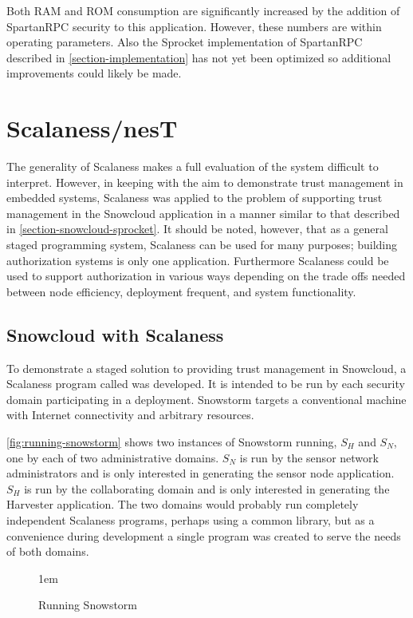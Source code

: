 Both RAM and ROM consumption are significantly increased by the addition of SpartanRPC security
to this application. However, these numbers are within operating parameters. Also the Sprocket
implementation of SpartanRPC described in \autoref{section-implementation} has not yet been
optimized so additional improvements could likely be made.

\section{Scalaness/nesT}
\label{section-scalaness-evaluation}

The generality of Scalaness makes a full evaluation of the system difficult to interpret.
However, in keeping with the aim to demonstrate trust management in embedded systems, Scalaness
was applied to the problem of supporting trust management in the Snowcloud application in a
manner similar to that described in \autoref{section-snowcloud-sprocket}. It should be noted,
however, that as a general staged programming system, Scalaness can be used for many purposes;
building authorization systems is only one application. Furthermore Scalaness could be used to
support authorization in various ways depending on the trade offs needed between node
efficiency, deployment frequent, and system functionality.

\subsection{Snowcloud with Scalaness}

To demonstrate a staged solution to providing trust management in Snowcloud, a Scalaness program
called  was developed. It is intended to be run by each security domain
participating in a deployment. Snowstorm targets a conventional machine with Internet
connectivity and arbitrary resources.

\autoref{fig:running-snowstorm} shows two instances of Snowstorm running, $S_H$ and $S_N$, one
by each of two administrative domains. $S_N$ is run by the sensor network administrators and is
only interested in generating the sensor node application. $S_H$ is run by the collaborating
domain and is only interested in generating the Harvester application. The two domains would
probably run completely independent Scalaness programs, perhaps using a common library, but as a
convenience during development a single program was created to serve the needs of both domains.

\begin{figure}[t]
  
  \centerline{\raise 1em\box\graph}
  \caption{Running Snowstorm}
  \label{fig:running-snowstorm}
\end{figure}

